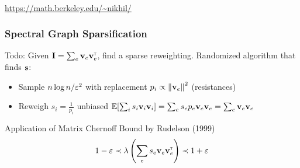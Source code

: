 \documentclass{beamer}
\begin{document}
\begin{frame}
\begin{center}
{
}
\end{center}
\pause 
{} \\
\pause 
\vspace{-0.2em}
\vspace{-1em}
\begin{flushright}
{\tiny \url{https://math.berkeley.edu/~nikhil/}}
\end{flushright}
\end{frame}
\begin{frame}
\frametitle{Spectral Graph Sparsification}
Todo: Given $\mathbf{I} = \sum_e \mathbf{v}_e \mathbf{v}_e ^\mathsf{\scriptscriptstyle T}$, find a sparse reweighting.
\moveb 
Randomized algorithm that finds $\mathbf{s}$:
\pause 
\begin{itemize}%
\item[] \hspace*{-.75cm}Sample $n \log n / \varepsilon^2$ with replacement $p_i \propto \left\|\mathbf{v}_e\right\|^2$ (resistances) \pause 
\item[] \hspace*{-.75cm}Reweigh $s_i = \tfrac{1}{p_i}$  unbiased $\mathbb{E}[\sum_i s_i \mathbf{v}_i \mathbf{v}_i] = \sum_e s_e p_e \mathbf{v}_e \mathbf{v}_e = \sum_e \mathbf{v}_e \mathbf{v}_e$ \pause 
\end{itemize} 
\bskip
{} 
\pause 
\begin{block}{Application of Matrix Chernoff Bound by Rudelson (1999) }
\[
1 - \varepsilon \prec \lambda\left(\sum_e s_e \mathbf{v}_e \mathbf{v}_e  ^\mathsf{\scriptscriptstyle T} \right) \prec 1+\varepsilon
\]
\end{block}
\pause 
\vspace{-0.5em}
\\ \smallskip

\end{frame}
\end{document}
